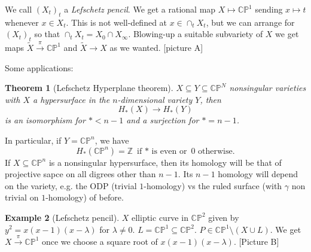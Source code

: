 \documentclass[11pt,A4]{article}
\theoremstyle{plain}
\newtheorem{thm}{Theorem}[section]
\theoremstyle{definition}
\newtheorem{exa}[thm]{Example}
\theoremstyle{remark}
\newcommand{\Z}{\mathbb{Z}}
\newcommand{\1}{\mathbbm{1}}
\begin{document}
We call $(X_{t})_{t}$ a \textit{Lefschetz pencil}.
We get a rational map $X\mapsto \mathbb{C}\mathbb{P}^{1}$ sending $x\mapsto t$ whenever $x\in X_{t}$.
This is not well-defined at $x\in \cap_{t}X_{t}$, but we can arrange for $(X_{t})_{t}$ so that $\cap_{t}X_{t}=X_{0}\cap X_{\infty}$.
Blowing-up a suitable subvariety of $X$ we get maps $\tilde{X}\xrightarrow{\pi} \mathbb{C}\mathbb{P}^{1}$ and $\tilde{X}\to X$ as we wanted.
[picture A]

Some applications:

\begin{thm}[Lefschetz Hyperplane theorem]
    $X\subseteq Y\subseteq \mathbb{C}\mathbb{P}^{N}$ nonsingular varieties with $X$ a hypersurface in the $n$-dimensional variety $Y$, then
    \[ H_{*}(X)\to H_{*}(Y) \]
    is an isomorphism for $*<n-1$ and a surjection for $*=n-1$.
\end{thm}

In particular, if $Y=\mathbb{C}\mathbb{P}^{n}$, we have
\[ H_{*}(\mathbb{C}\mathbb{P}^{n})=\Z \text{ if $*$ is even or } 0 \text{ otherwise}.\]
If $X\subseteq \mathbb{C}\mathbb{P}^{n}$ is a nonsingular hypersurface, then its homology will be that of projective sapce on all digrees other than $n-1$.
Its $n-1$ homology will depend on the variety, e.g. the ODP (trivial $1$-homology) vs the ruled surface (with $\gamma$ non trivial on $1$-homology) of before.

\begin{exa}[Lefschetz pencil]
    $X$ elliptic curve in $\mathbb{C}\mathbb{P}^{2}$ given by $y^{2}=x(x-1)(x-\lambda)$ for $\lambda\neq 0$.
    $L=\mathbb{C}\mathbb{P}^{1}\subseteq \mathbb{C}\mathbb{P}^{2}$.
    $P\in \mathbb{C}\mathbb{P}^{1}\setminus (X\cup L)$.
    We get $X\xrightarrow{\pi}\mathbb{C}\mathbb{P}^{1}$ once we choose a square root of $x(x-1)(x-\lambda)$.
    [Picture B]
\end{exa}



\end{document}
